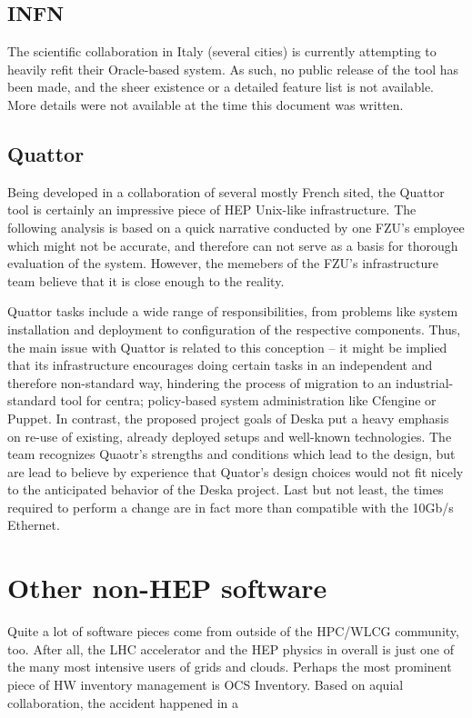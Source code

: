 \documentclass[12pt]{article}
\begin{document}
\subsection{INFN}
The scientific collaboration in Italy (several cities) is currently attempting to heavily refit their Oracle-based system.  As
such, no public release of the tool has been made, and the sheer existence or a detailed feature list is not available.  More
details were not available at the time this document was written.

\subsection{Quattor}
Being developed in a collaboration of several mostly French sited, the Quattor tool is certainly an impressive piece of HEP
Unix-like infrastructure.  The following analysis is based on a quick narrative conducted by one FZU's employee which might not be
accurate, and therefore can not serve as a basis for thorough evaluation of the system.  However, the memebers of the FZU's
infrastructure team believe that it is close enough to the reality.

Quattor tasks include a wide range of responsibilities, from problems like system installation and deployment to configuration of
the respective components.  Thus, the main issue with Quattor is related to this conception -- it might be implied that its
infrastructure encourages doing certain tasks in an independent and therefore non-standard way, hindering the process of migration
to an industrial-standard tool for centra; policy-based system administration like Cfengine or Puppet.  In contrast, the proposed
project goals of Deska put a heavy emphasis on re-use of existing, already deployed setups and well-known technologies.  The team
recognizes Quaotr's strengths and conditions which lead to the design, but are lead to believe by experience that Quator's design
choices would not fit nicely to the anticipated behavior of the Deska project.  Last but not least, the times required to perform
a change are in fact more than compatible with the 10Gb/s  Ethernet.

\section{Other non-HEP software}
Quite a lot of software pieces come from outside of the HPC/WLCG community, too.  After all, the LHC accelerator and the HEP
physics in overall is just one of the many most intensive users of grids and clouds.  Perhaps the most prominent piece of HW
inventory management is OCS Inventory.  Based on aquial collaboration, the accident happened in a 
\end{document}
